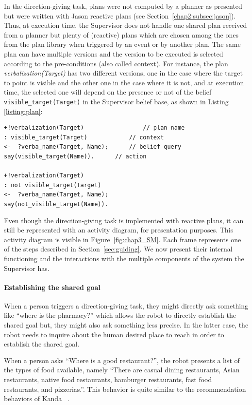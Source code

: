 \documentclass[a4paper,11pt,twoside]{StyleThese}
\begin{document}
In the direction-giving task, plans were not computed by a planner as presented but were written with Jason reactive plans (see Section~\ref{chap2:subsec:jason}). Thus, at execution time, the Supervisor does not handle one shared plan received from a planner but plenty of (reactive) plans which are chosen among the ones from the plan library when triggered by an event or by another plan. The same plan can have multiple versions and the version to be executed is selected according to the pre-conditions (also called context). For instance, the plan \textit{verbalization(Target)} has two different versions, one in the case where the target to point is visible and the other one in the case where it is not, and at execution time, the selected one will depend on the presence or not of the belief \texttt{visible\_target(Target)} in the Supervisor belief base, as shown in Listing \ref{listing:plan}:

\begin{lstlisting}[caption = Two different plans for \texttt{verbalization(Target)}, label = {listing:plan}]
+!verbalization(Target)                 // plan name
: visible_target(Target)            // context
<-  ?verba_name(Target, Name);      // belief query
say(visible_target(Name)).      // action

+!verbalization(Target) 
: not visible_target(Target)
<-  ?verba_name(Target, Name);
say(not_visible_target(Name)).
\end{lstlisting}

Even though the direction-giving task is implemented with reactive plans, it can still be represented with an activity diagram, for presentation purposes. This activity diagram is visible in Figure~\ref{fig:chap3_SM}. Each frame represents one of the steps described in Section~\ref{sec:guiding}. We now present their internal functioning and the interactions with the multiple components of the system the Supervisor has.

\paragraph{Establishing the shared goal}
When a person triggers a direction-giving task, they might directly ask something like ``where is the pharmacy?'' which allows the robot to directly establish the shared goal but, they might also ask something less precise. In the latter case, the robot needs to inquire about the human desired place to reach in order to establish the shared goal.

When a person asks ``Where is a good restaurant?'', the robot presents a list of the types of food available, namely ``There are casual dining restaurants, Asian restaurants, native food restaurants, hamburger restaurants, fast food restaurants, and pizzerias.''. This behavior is quite similar to the recommendation behaviors of Kanda \etal{}~\cite{kanda_2009_affective}.
\end{document}

